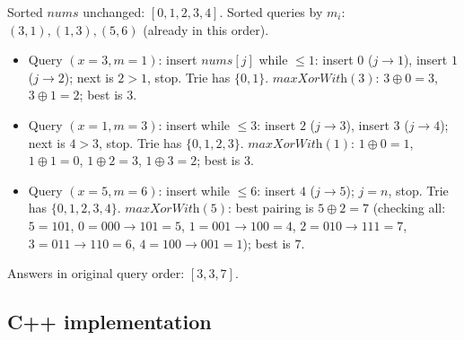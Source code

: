 
Sorted $\textit{nums}$ unchanged: $[0,1,2,3,4]$. Sorted queries by
$m_i$: $(3,1), (1,3), (5,6)$ (already in this order).

\begin{itemize}
  \item Query $(x{=}3, m{=}1)$: insert $\textit{nums}[j]$ while
        $\le1$: insert $0$ ($j\to1$), insert $1$ ($j\to2$); next is
        $2>1$, stop. Trie has $\{0,1\}$.
        $\textit{maxXorWith}(3)$: $3\oplus0=3$, $3\oplus1=2$; best is
        $3$.
  \item Query $(x{=}1, m{=}3)$: insert while $\le3$: insert $2$
        ($j\to3$), insert $3$ ($j\to4$); next is $4>3$, stop. Trie has
        $\{0,1,2,3\}$. $\textit{maxXorWith}(1)$: $1\oplus0=1$,
        $1\oplus1=0$, $1\oplus2=3$, $1\oplus3=2$; best is $3$.
  \item Query $(x{=}5, m{=}6)$: insert while $\le6$: insert $4$
        ($j\to5$); $j=n$, stop. Trie has $\{0,1,2,3,4\}$.
        $\textit{maxXorWith}(5)$: best pairing is $5\oplus2=7$ (checking
        all: $5{=}101$, $0{=}000\to101{=}5$, $1{=}001\to100{=}4$,
        $2{=}010\to111{=}7$, $3{=}011\to110{=}6$, $4{=}100\to001{=}1$);
        best is $7$.
\end{itemize}

Answers in original query order: $[3,3,7]$.

\subsection*{C++ implementation}

